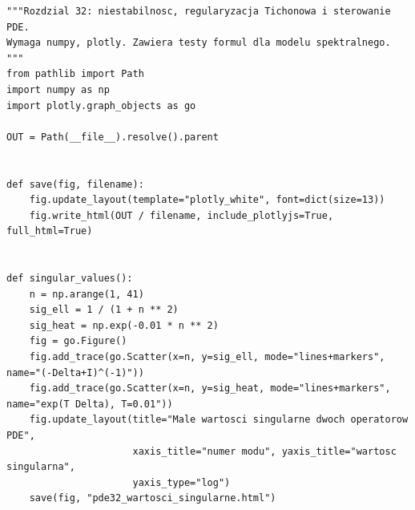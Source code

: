 \begin{lstlisting}[style=pythonpde,caption={Eksperymenty rozdziału 32 (Python i Plotly)},label={code:pde32-plotly}]
"""Rozdzial 32: niestabilnosc, regularyzacja Tichonowa i sterowanie PDE.
Wymaga numpy, plotly. Zawiera testy formul dla modelu spektralnego.
"""
from pathlib import Path
import numpy as np
import plotly.graph_objects as go

OUT = Path(__file__).resolve().parent


def save(fig, filename):
    fig.update_layout(template="plotly_white", font=dict(size=13))
    fig.write_html(OUT / filename, include_plotlyjs=True, full_html=True)


def singular_values():
    n = np.arange(1, 41)
    sig_ell = 1 / (1 + n ** 2)
    sig_heat = np.exp(-0.01 * n ** 2)
    fig = go.Figure()
    fig.add_trace(go.Scatter(x=n, y=sig_ell, mode="lines+markers", name="(-Delta+I)^(-1)"))
    fig.add_trace(go.Scatter(x=n, y=sig_heat, mode="lines+markers", name="exp(T Delta), T=0.01"))
    fig.update_layout(title="Male wartosci singularne dwoch operatorow PDE",
                      xaxis_title="numer modu", yaxis_title="wartosc singularna",
                      yaxis_type="log")
    save(fig, "pde32_wartosci_singularne.html")



\end{lstlisting}
